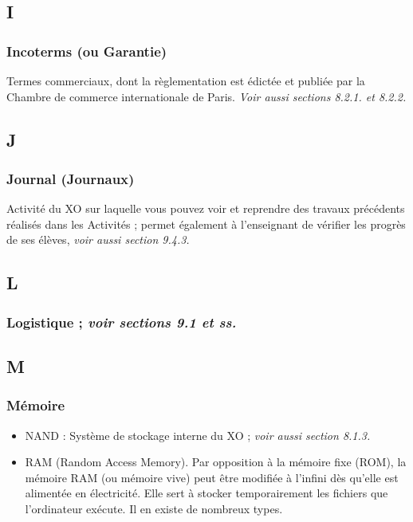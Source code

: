 \documentclass[12pt]{article}
\begin{document}
\subsection{I}
\label{sec-14-8}

   
\subsubsection{Incoterms (ou Garantie)}
\label{sec-14-8-1}


Termes commerciaux, dont la règlementation est édictée et publiée par la
Chambre de commerce internationale de Paris.  \emph{Voir aussi sections 8.2.1. et 8.2.2.}
\subsection{J}
\label{sec-14-9}
\subsubsection{Journal (Journaux)}
\label{sec-14-9-1}


Activité du XO sur laquelle vous pouvez voir et reprendre des travaux
précédents réalisés dans les Activités ; permet également à l'enseignant de
vérifier les progrès de ses élèves, \emph{voir aussi section 9.4.3.}
\subsection{L}
\label{sec-14-10}
\subsubsection{Logistique ;  \emph{voir sections 9.1 et ss.}}
\label{sec-14-10-1}
\subsection{M}
\label{sec-14-11}
\subsubsection{Mémoire}
\label{sec-14-11-1}


\begin{itemize}
\item NAND : Système de stockage interne du XO ; \emph{voir aussi section 8.1.3.}
\item RAM (Random Access Memory). Par opposition à la mémoire fixe (ROM), la
  mémoire RAM (ou mémoire vive) peut être modifiée à l'infini dès qu'elle
  est alimentée en électricité. Elle sert à stocker temporairement les
  fichiers que l'ordinateur exécute. Il en existe de nombreux types.
\end{itemize}
\end{document}
